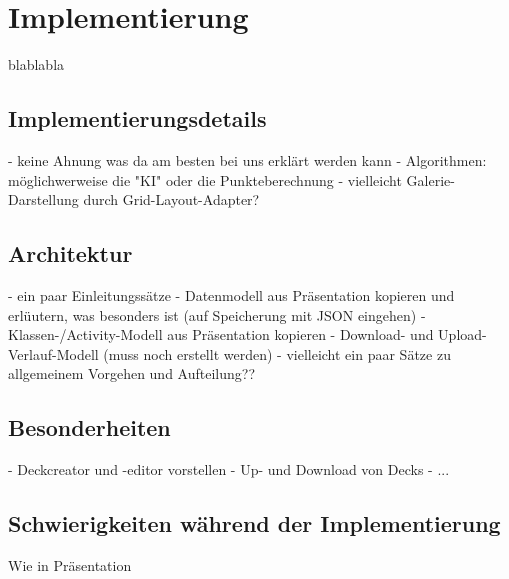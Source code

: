 \chapter{Implementierung}
\label{cha:implementierung}

blablabla

\section{Implementierungsdetails}
\label{sec:implementierung:implementierungsdetails}

- keine Ahnung was da am besten bei uns erklärt werden kann
- Algorithmen: möglichwerweise die "KI" oder die Punkteberechnung
- vielleicht Galerie-Darstellung durch Grid-Layout-Adapter?

\section{Architektur}
\label{sec:implementierung:architektur}

- ein paar Einleitungssätze
- Datenmodell aus Präsentation kopieren und erlüutern, was besonders ist (auf Speicherung mit JSON eingehen)
- Klassen-/Activity-Modell aus Präsentation kopieren
- Download- und Upload-Verlauf-Modell (muss noch erstellt werden)
- vielleicht ein paar Sätze zu allgemeinem Vorgehen und Aufteilung??

\section{Besonderheiten}
\label{sec:implementierung:besonderheiten }	

- Deckcreator und -editor vorstellen
- Up- und Download von Decks
- ...

\section{Schwierigkeiten während der Implementierung}
\label{sec:implementierung:schwierigkeiten }	

Wie in Präsentation